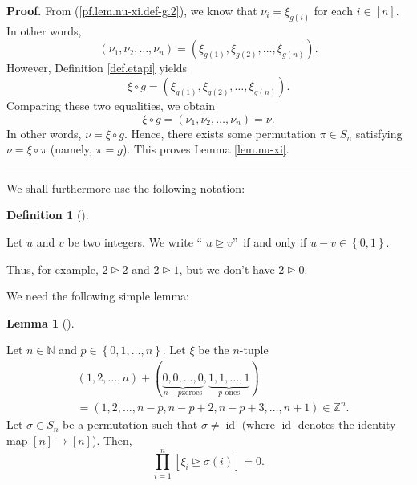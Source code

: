 \documentclass[numbers=enddot,12pt,final,onecolumn,notitlepage,english]{scrartcl}%
\theoremstyle{definition}
\newtheorem{lem}[theo]{Lemma}
\newenvironment{lemma}[1][]
{\begin{lem}[#1]\begin{leftbar}}
{\end{leftbar}\end{lem}}
\newtheorem{defi}[theo]{Definition}
\newenvironment{definition}[1][]
{\begin{defi}[#1]\begin{leftbar}}
{\end{leftbar}\end{defi}}
\newenvironment{proof}[1][Proof]{\noindent\textbf{#1.} }{\ \rule{0.5em}{0.5em}}
\let\prodnonlimits\prod
\renewcommand{\prod}{\prodnonlimits\limits}
\newenvironment{verlong}{}{}
\begin{document}
\begin{verlong}
\begin{proof}
From (\ref{pf.lem.nu-xi.def-g.2}), we know that $\nu_{i}=\xi_{g\left(
i\right)  }$ for each $i\in\left[  n\right]  $. In other words,%
\[
\left(  \nu_{1},\nu_{2},\ldots,\nu_{n}\right)  =\left(  \xi_{g\left(
1\right)  },\xi_{g\left(  2\right)  },\ldots,\xi_{g\left(  n\right)  }\right)
.
\]
However, Definition \ref{def.etapi} yields%
\[
\xi\circ g=\left(  \xi_{g\left(  1\right)  },\xi_{g\left(  2\right)  }%
,\ldots,\xi_{g\left(  n\right)  }\right)  .
\]
Comparing these two equalities, we obtain%
\[
\xi\circ g=\left(  \nu_{1},\nu_{2},\ldots,\nu_{n}\right)  =\nu.
\]
In other words, $\nu=\xi\circ g$. Hence, there exists some permutation $\pi\in
S_{n}$ satisfying $\nu=\xi\circ\pi$ (namely, $\pi=g$). This proves Lemma
\ref{lem.nu-xi}.
\end{proof}
\end{verlong}

We shall furthermore use the following notation:

\begin{definition}
\label{def.cover01}Let $u$ and $v$ be two integers. We write \textquotedblleft%
$u\trianglerighteq v$\textquotedblright\ if and only if $u-v\in\left\{
0,1\right\}  $.
\end{definition}

Thus, for example, $2\trianglerighteq2$ and $2\trianglerighteq1$, but we don't
have $2\trianglerighteq0$.

We need the following simple lemma:

\begin{lemma}
\label{lem.xi-unique}Let $n\in\mathbb{N}$ and $p\in\left\{  0,1,\ldots
,n\right\}  $. Let $\xi$ be the $n$-tuple
\begin{align*}
&  \left(  1,2,\ldots,n\right)  +\left(  \underbrace{0,0,\ldots,0}_{n-p\text{
zeroes}},\underbrace{1,1,\ldots,1}_{p\text{ ones}}\right) \\
&  =\left(  1,2,\ldots,n-p,n-p+2,n-p+3,\ldots,n+1\right)  \in\mathbb{Z}^{n}.
\end{align*}
Let $\sigma\in S_{n}$ be a permutation such that $\sigma\neq\operatorname*{id}%
$ (where $\operatorname*{id}$ denotes the identity map $\left[  n\right]
\rightarrow\left[  n\right]  $). Then,%
\[
\prod_{i=1}^{n}\left[  \xi_{i}\trianglerighteq\sigma\left(  i\right)  \right]
=0.
\]

\end{lemma}
\end{document}

